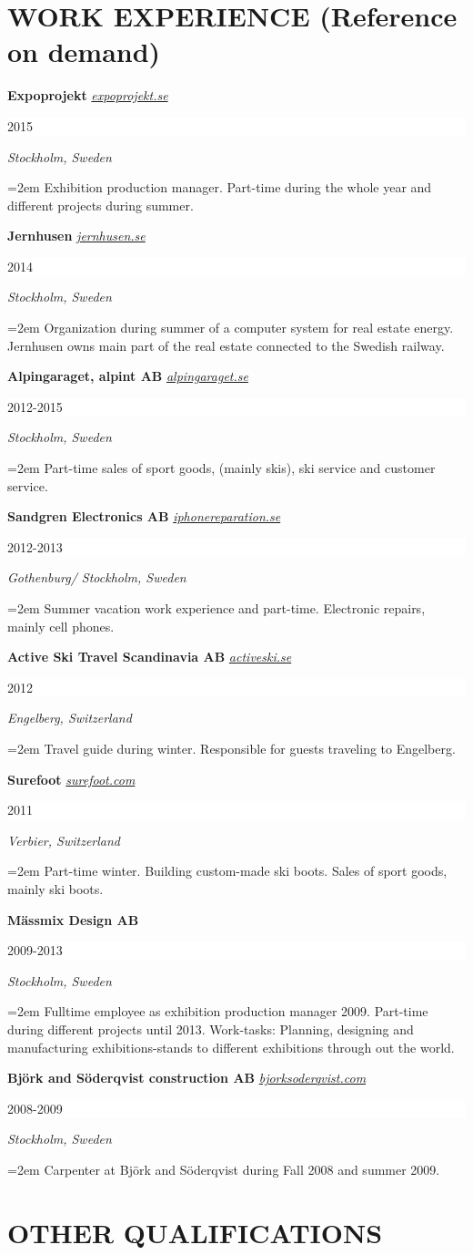 \documentclass[paper=letter,fontsize=11pt]{scrartcl} %
\newcommand{\sepspace}{\vspace*{1em}}		%
\newcommand{\NewPart}[2]{\section*{\uppercase{#1} \small \normalfont #2}}
\newcommand{\WorkEntry}[5]{
		\noindent \textbf{#1}
        \noindent \small \textit{#2}
        \hfill      %
        \colorbox{White}{%
			\parbox{6em}{%
			\hfill\color{Black}#3}} \par  %
		\noindent \textit{#4} \par        %
		\noindent\hangindent=2em\hangafter=0 \small #5 %
		\normalsize \par}
\begin{document}
\NewPart{Work Experience}{(Reference on demand)}

\WorkEntry{Expoprojekt}{\href{http://expoprojekt.se}{expoprojekt.se}}{2015}{Stockholm, Sweden}{Exhibition production manager. Part-time during the whole year and different projects during summer.}

\sepspace

\WorkEntry{Jernhusen}{\href{http://jernhusen.se}{jernhusen.se}}{2014}{Stockholm, Sweden}{Organization during summer of a computer system for real estate energy. Jernhusen owns main part of the real estate connected to the Swedish railway.}

\sepspace

\WorkEntry{Alpingaraget, alpint AB}{\href{http://alpingaraget.se}{alpingaraget.se}}{2012-2015}{Stockholm, Sweden}{Part-time sales of sport goods, (mainly skis), ski service and customer service.}
\newpage

\WorkEntry{Sandgren Electronics AB}{\href{http://iphonereparation.se}{iphonereparation.se}}{2012-2013}{Gothenburg/ Stockholm, Sweden}{Summer vacation work experience and part-time. Electronic repairs, mainly cell phones.}

\sepspace

\WorkEntry{Active Ski Travel Scandinavia AB}{\href{http://www.activeski.se}{activeski.se}}{2012}{Engelberg, Switzerland}{Travel guide during winter. Responsible for guests traveling to Engelberg.}

\sepspace

\WorkEntry{Surefoot}{\href{http://www.surefoot.com}{surefoot.com}}{2011}{Verbier, Switzerland}{Part-time winter. Building custom-made ski boots. Sales of sport goods, mainly ski boots.}
\sepspace

\WorkEntry{Mässmix Design AB }{}{2009-2013}{Stockholm, Sweden}{Fulltime employee as exhibition production manager 2009. Part-time during different projects until 2013. Work-tasks: Planning, designing and manufacturing exhibitions-stands to different exhibitions through out the world.}
\sepspace

\WorkEntry{Björk and Söderqvist construction AB}{\href{http://bjorksoderqvist.com}{bjorksoderqvist.com}}{2008-2009}{Stockholm, Sweden}{Carpenter at Björk and Söderqvist during Fall 2008 and summer 2009.}

\sepspace



\NewPart{OTHER QUALIFICATIONS}{}
\end{document}
